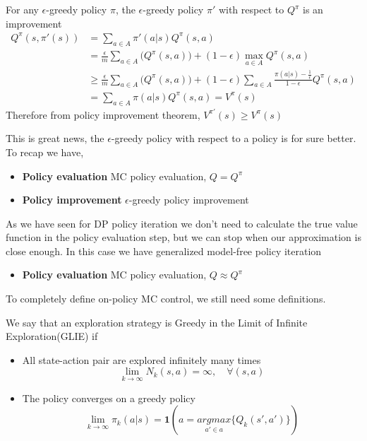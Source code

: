 \documentclass[main.tex]{subfiles}
\begin{document}
\begin{theorem}
For any $\epsilon$-greedy policy $\pi$, the $\epsilon$-greedy policy $\pi'$ with respect to $Q^{\pi}$ is an improvement
\begin{align*}
    Q^{\pi}(s,\pi'(s)) &= \sum_{a \in A} \pi'(a|s) Q^{\pi}(s,a) \\
    &= \frac{\epsilon}{m} \sum_{a \in A} \big( Q^{\pi}(s,a) \big) + (1-\epsilon) \max_{a \in A} Q^{\pi}(s,a) \\
    &\geq \frac{\epsilon}{m} \sum_{a \in A} \big( Q^{\pi}(s,a) \big) + (1-\epsilon) \sum_{a \in A} \frac{\pi(a|s) - \frac{1}{\epsilon}}{1 - \epsilon} Q^{\pi}(s,a) \\
    &= \sum_{a \in A} \pi(a|s) Q^{\pi}(s,a) = V^{\pi}(s)
\end{align*}
Therefore from policy improvement theorem, $V^{\pi'}(s) \geq V^{\pi}(s)$
\end{theorem}
\par
\noindent
This is great news, the $\epsilon$-greedy policy with respect to a policy is for sure better.
To recap we have,
\begin{itemize}
    \item \textbf{Policy evaluation} MC policy evaluation, $Q=Q^{\pi}$
    \item \textbf{Policy improvement} $\epsilon$-greedy policy improvement
\end{itemize}
As we have seen for DP policy iteration we don't need to calculate the true value function in the policy evaluation step, but we can stop when our approximation is close enough. In this case we have generalized model-free policy iteration
\begin{itemize}
    \item \textbf{Policy evaluation} MC policy evaluation, $Q \approx Q^{\pi}$
\end{itemize}
To completely define on-policy MC control, we still need some definitions.
\begin{definition}[GLIE]
We say that an exploration strategy is Greedy in the Limit of Infinite Exploration(GLIE) if
\begin{itemize}
    \item All state-action pair are explored infinitely many times
    \begin{equation*}
        \lim_{k \rightarrow \infty} N_k(s,a) = \infty, \quad \forall(s,a)
    \end{equation*}
    \item The policy converges on a greedy policy
    \begin{equation*}
        \lim_{k \rightarrow \infty} \pi_k(a|s) = \mathbf{1}(a = \underset{a' \in a}{argmax}\{ Q_k(s',a') \})
    \end{equation*}
\end{itemize}
\end{definition}
\end{document}
